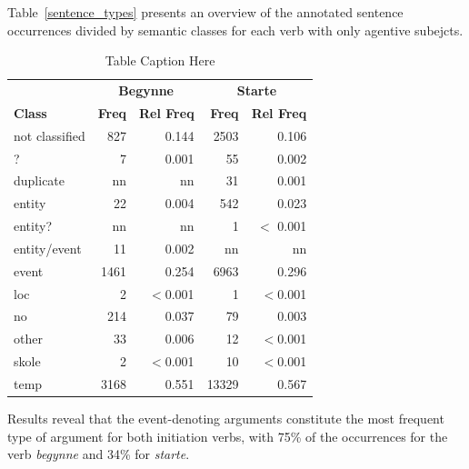 \documentclass{article}
\begin{document}
Table~\ref{sentence_types} presents an overview of the annotated sentence occurrences divided by semantic classes for each verb with only agentive subejcts.
\begin{table}[!]
    \centering
    \begin{tabular}{lrrrr}
        \toprule
        & \multicolumn{2}{c}{\textbf{Begynne}} & \multicolumn{2}{c}{\textbf{Starte}} \\
        \cmidrule(lr){2-3} \cmidrule(lr){4-5}
        \textbf{Class} & \textbf{Freq} & \textbf{Rel Freq} & \textbf{Freq} & \textbf{Rel Freq} \\
        \midrule

        not classified  &        827 & 0.144    &       2503 &    0.106 \\
        ?               &          7 & 0.001    &         55 &    0.002\\
        duplicate       &        nn  & nn       &         31 &    0.001 \\
        entity          &         22 & 0.004    &        542 &    0.023\\
        entity?         &        nn   & nn         &          1 &    $<$ 0.001 \\
        entity/event    &         11 & 0.002    &      nn      &      nn        \\
        event           &       1461 & 0.254    &       6963 &    0.296\\
        loc             &          2 & $<$0.001 &          1 &    $<$0.001\\
        no              &        214 & 0.037    &         79 &    0.003\\
        other           &         33 & 0.006    &         12 &    $<$0.001\\
        skole           &          2 & $<$0.001 &         10 &    $<$0.001 \\
        temp            &       3168 & 0.551    &      13329 &    0.567\\
        \bottomrule
    \end{tabular}
    \caption{Table Caption Here}
    \label{tab:mytable}
\end{table}
Results reveal that the event-denoting arguments constitute the most frequent type of argument for both initiation verbs, with 75\% of the occurrences for the verb \emph{begynne} and 34\% for \emph{starte}. 
\end{document}
